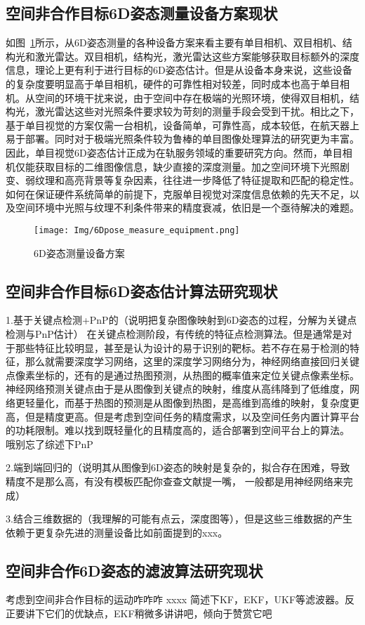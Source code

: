 \subsection{空间非合作目标6D姿态测量设备方案现状}
如图~\ref{fig:6D_equip}所示，从6D姿态测量的各种设备方案来看主要有单目相机\cite{PAULY2023339, 9802504,Zhang_2024_CVPR,Liu_2024_CVPR}、双目相机\cite{GXXB202106018, zhang2017optimization,Fan2024}、结构光\cite{laser_stereo,hu2023non,sun2022relative}和激光雷达\cite{10801205,10823741}。双目相机，结构光，激光雷达这些方案能够获取目标额外的深度信息，理论上更有利于进行目标的6D姿态估计。但是从设备本身来说，这些设备的复杂度要明显高于单目相机，硬件的可靠性相对较差，同时成本也高于单目相机。从空间的环境干扰来说，由于空间中存在极端的光照环境，使得双目相机，结构光，激光雷达这些对光照条件要求较为苛刻的测量手段会受到干扰\cite{rs15092286,tian2023all}。相比之下，基于单目视觉的方案仅需一台相机，设备简单，可靠性高，成本较低，在航天器上易于部署。同时对于极端光照条件较为鲁棒的单目图像处理算法的研究更为丰富。因此，单目视觉6D姿态估计正成为在轨服务领域的重要研究方向。然而，单目相机仅能获取目标的二维图像信息，缺少直接的深度测量。加之空间环境下光照剧变、弱纹理和高亮背景等复杂因素，往往进一步降低了特征提取和匹配的稳定性\cite{Hu_2021_CVPR,wang2022revisiting}。如何在保证硬件系统简单的前提下，克服单目视觉对深度信息依赖的先天不足，以及空间环境中光照与纹理不利条件带来的精度衰减，依旧是一个亟待解决的难题。
\begin{figure}[htbp]
	\centering
	\texttt{[image: Img/6Dpose\_measure\_equipment.png]}
	\caption{6D姿态测量设备方案}
	\label{fig:6D_equip}
\end{figure}

\subsection{空间非合作目标6D姿态估计算法研究现状}





1.基于关键点检测+PnP的（说明把复杂图像映射到6D姿态的过程，分解为关键点检测与PnP估计）
在关键点检测阶段，有传统的特征点检测算法。但是通常是对于那些特征比较明显，甚至是认为设计的易于识别的靶标。若不存在易于检测的特征，那么就需要深度学习网络，这里的深度学习网络分为，神经网络直接回归关键点像素坐标的，还有的是通过热图预测，从热图的概率值来定位关键点像素坐标。神经网络预测关键点由于是从图像到关键点的映射，维度从高纬降到了低维度，网络更轻量化，而基于热图的预测是从图像到热图，是高维到高维的映射，复杂度更高，但是精度更高。但是考虑到空间任务的精度需求，以及空间任务内置计算平台的功耗限制。难以找到既轻量化的且精度高的，适合部署到空间平台上的算法。 哦别忘了综述下PnP



2.端到端回归的（说明其从图像到6D姿态的映射是复杂的，拟合存在困难，导致精度不是那么高，有没有模板匹配你查查文献提一嘴， 一般都是用神经网络来完成）

3.结合三维数据的（我理解的可能有点云，深度图等），但是这些三维数据的产生依赖于更复杂先进的测量设备比如前面提到的xxx。



\subsection{空间非合作6D姿态的滤波算法研究现状}

考虑到空间非合作目标的运动咋咋咋
xxxx
简述下KF，EKF，UKF等滤波器。反正要讲下它们的优缺点，EKF稍微多讲讲吧，倾向于赞赏它吧
